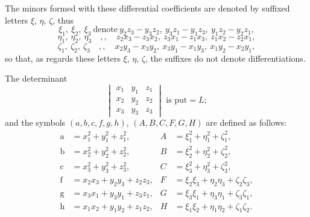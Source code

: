 \documentclass[11pt,a4paper]{article}
\begin{document}
The minors formed with these differential coefficients are denoted by suffixed letters $\xi$, $\eta$, $\zeta$, thus
\[
\xi_{1},\ \xi_{2},\ \xi_{3}\ \text{denote}\ y_{2}z_{3}-y_{3}z_{2},\ y_{3}z_{1}-y_{1}z_{3},\ y_{1}z_{2}-y_{2}z_{1},
\]
\[
\eta_{1},\ \eta_{2},\ \eta_{3}\quad,,\quad z_{2}x_{3}-z_{3}x_{2},\ z_{3}x_{1}-z_{1}x_{3},\ z_{1}x_{2}-z_{2}x_{1},
\]
\[
\zeta_{1},\ \zeta_{2},\ \zeta_{3}\quad,,\quad x_{2}y_{3}-x_{3}y_{2},\ x_{3}y_{1}-x_{1}y_{3},\ x_{1}y_{2}-x_{2}y_{1},
\]
so that, as regards these letters $\xi$, $\eta$, $\zeta$, the suffixes do not denote differentiations.

\medskip

The determinant
\[
\begin{vmatrix} x_{1} & y_{1} & z_{1} \\ x_{2} & y_{2} & z_{2} \\ x_{3} & y_{3} & z_{3} \end{vmatrix} \text{ is put} = L;
\]
and the symbols $(a, b, c, f, g, h)$, $(A, B, C, F, G, H)$ are defined as follows:
\begin{align*}
\text{a} &= x_{1}^{2} + y_{1}^{2} + z_{1}^{2}, & A &= \xi_{1}^{2} + \eta_{1}^{2} + \zeta_{1}^{2},\\
\text{b} &= x_{2}^{2} + y_{2}^{2} + z_{2}^{2}, & B &= \xi_{2}^{2} + \eta_{2}^{2} + \zeta_{2}^{2},\\
\text{c} &= x_{3}^{2} + y_{3}^{2} + z_{3}^{2}, & C &= \xi_{3}^{2} + \eta_{3}^{2} + \zeta_{3}^{2},\\
\text{f} &= x_{2}x_{3} + y_{2}y_{3} + z_{2}z_{3}, & F &= \xi_{2}\xi_{3} + \eta_{2}\eta_{3} + \zeta_{2}\zeta_{3},\\
\text{g} &= x_{3}x_{1} + y_{3}y_{1} + z_{3}z_{1}, & G &= \xi_{3}\xi_{1} + \eta_{3}\eta_{1} + \zeta_{3}\zeta_{1},\\
\text{h} &= x_{1}x_{2} + y_{1}y_{2} + z_{1}z_{2}, & H &= \xi_{1}\xi_{2} + \eta_{1}\eta_{2} + \zeta_{1}\zeta_{2}.
\end{align*}
\end{document}
